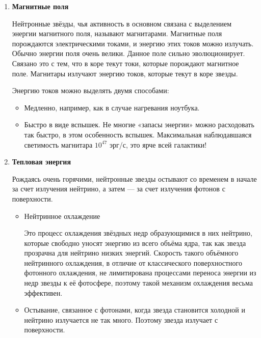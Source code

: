 \begin{enumerate}
	\item \textbf{Магнитные поля}
	
	Нейтронные звёзды, чья активность в основном связана с выделением энергии магнитного поля, называют магнитарами. Магнитные поля порождаются электрическими токами, и энергию этих токов можно излучать. Обычно энергии поля очень велики.
	Данное поле сильно эволюционирует. Связано это с тем, что в коре текут токи, которые порождают магнитное поле. Магнитары излучают энергию токов, которые текут в коре звезды.
	
	Энергию токов можно выделять двумя способами:
	
	\begin{itemize}
		\item Медленно, например, как в случае нагревания ноутбука.
		
		\item Быстро в виде вспышек. Не многие «запасы энергии» можно расходовать так быстро, в этом особенность вспышек. Максимальная наблюдавшаяся светимость магнитара $10^47$ эрг/с, это ярче всей галактики!
	\end{itemize}

	\item \textbf{Тепловая энергия}
	
	Рождаясь очень горячими, нейтронные звезды остывают со временем в начале за счет излучения нейтрино, а затем --- за счет излучения фотонов с поверхности.
	
	\begin{itemize}
		\item Нейтринное охлаждение
		
		Это процесс охлаждения звёздных недр образующимися в них нейтрино, которые свободно уносят энергию из всего объёма ядра, так как звезда прозрачна для нейтрино низких энергий. Скорость такого объёмного нейтринного охлаждения, в отличие от классического поверхностного фотонного охлаждения, не лимитирована процессами переноса энергии из недр звезды к её фотосфере, поэтому такой механизм охлаждения весьма эффективен.
		
		\item Остывание, связанное с фотонами, когда звезда становится холодной и нейтрино излучается не так много. Поэтому звезда излучает с поверхности.
	\end{itemize}
\end{enumerate}